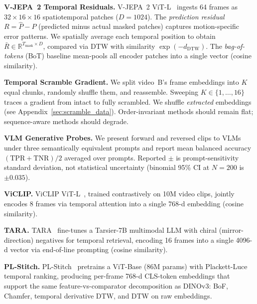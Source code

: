 \documentclass{article}
\theoremstyle{remark}
\begin{document}
\textbf{V-JEPA~2 Temporal Residuals.} V-JEPA~2 ViT-L~\cite{vjepa2} ingests 64 frames as $32 \times 16 \times 16$ spatiotemporal patches ($D\!=\!1024$). The \emph{prediction residual} $R = \hat{P} - P$ (predicted minus actual masked patches) captures motion-specific error patterns. We spatially average each temporal position to obtain $\bar{R} \in \mathbb{R}^{T_\text{mask} \times D}$, compared via DTW with similarity $\exp(-d_\text{DTW})$. The \emph{bag-of-tokens} (BoT) baseline mean-pools all encoder patches into a single vector (cosine similarity).

\textbf{Temporal Scramble Gradient.} We split video~B's frame embeddings into $K$ equal chunks, randomly shuffle them, and reassemble. Sweeping $K \in \{1, \ldots, 16\}$ traces a gradient from intact to fully scrambled. We shuffle \emph{extracted} embeddings (see Appendix~\ref{sec:scramble_data}). Order-invariant methods should remain flat; sequence-aware methods should degrade.

\textbf{VLM Generative Probes.} We present forward and reversed clips to VLMs under three semantically equivalent prompts and report mean balanced accuracy $(\mathrm{TPR}+\mathrm{TNR})/2$ averaged over prompts. Reported $\pm$ is prompt-sensitivity standard deviation, not statistical uncertainty (binomial 95\% CI at $N\!=\!200$ is $\pm 0.035$).

\textbf{ViCLIP.} ViCLIP ViT-L~\cite{viclip}, trained contrastively on 10M video clips, jointly encodes 8 frames via temporal attention into a single 768-d embedding (cosine similarity).

\textbf{TARA.} TARA~\cite{tara} fine-tunes a Tarsier-7B multimodal LLM with chiral (mirror-direction) negatives for temporal retrieval, encoding 16 frames into a single 4096-d vector via end-of-line prompting (cosine similarity).

\textbf{PL-Stitch.} PL-Stitch~\cite{plstitch} pretrains a ViT-Base (86M params) with Plackett-Luce temporal ranking, producing per-frame 768-d CLS-token embeddings that support the same feature-vs-comparator decomposition as DINOv3: BoF, Chamfer, temporal derivative DTW, and DTW on raw embeddings.
\end{document}
